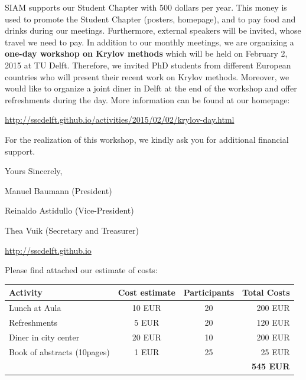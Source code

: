 \documentclass[a4paper,10pt]{article}
\begin{document}
\bigskip
SIAM supports our Student Chapter with 500 dollars per year. This money is used to promote the Student Chapter (posters, homepage), and to pay food and drinks during our meetings. Furthermore, external speakers will be invited, whose travel we need to pay. In addition to our monthly meetings, we are organizing a \textbf{one-day workshop on Krylov methods} which will be held on February 2, 2015 at TU Delft. Therefore, we invited PhD students from different European countries who will present their recent work on Krylov methods. Moreover, we would like to organize a joint diner in Delft at the end of the workshop and offer refreshments during the day. More information can be found at our homepage:
\begin{center}
 \url{http://sscdelft.github.io/activities/2015/02/02/krylov-day.html}
\end{center}



\bigskip
\noindent For the realization of this workshop, we kindly ask you for additional financial support.

\bigskip
\noindent Yours Sincerely,

\bigskip 
\bigskip

\noindent Manuel Baumann (President)

\noindent Reinaldo Astidullo (Vice-President)

\noindent Thea Vuik (Secretary and Treasurer)

\noindent \url{http://sscdelft.github.io}

\newpage
Please find attached our estimate of costs:
\begin{table}[h]
\centering
\begin{tabular}{lccr}
 Activity & Cost estimate & Participants & Total Costs  \\
 \hline
 Lunch at Aula & 10 EUR  & 20  & 200 EUR   \\
 Refreshments & 5 EUR & 20 & 120 EUR \\
 Diner in city center & 20 EUR & 10  & 200 EUR   \\
 Book of abstracts (10pages)& 1 EUR  & 25 & 25 EUR \\
 & & & \textbf{545 EUR}
\end{tabular}
\end{table}
\end{document}
